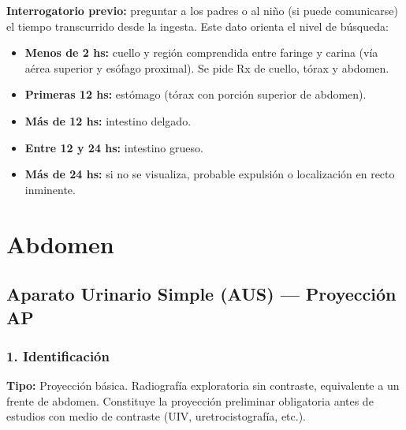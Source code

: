 	\medskip
	
	\textbf{Interrogatorio previo:} preguntar a los padres o al niño (si puede comunicarse) el tiempo transcurrido desde la ingesta. Este dato orienta el nivel de búsqueda:
	
	\begin{itemize}
		\item \textbf{Menos de 2 hs:} cuello y región comprendida entre faringe y carina (vía aérea superior y esófago proximal). Se pide Rx de cuello, tórax y abdomen.
		\item \textbf{Primeras 12 hs:} estómago (tórax con porción superior de abdomen).
		\item \textbf{Más de 12 hs:} intestino delgado.
		\item \textbf{Entre 12 y 24 hs:} intestino grueso.
		\item \textbf{Más de 24 hs:} si no se visualiza, probable expulsión o localización en recto inminente.
	\end{itemize}
	
	
\clearpage
	
	\section{Abdomen}
	
	\subsection{Aparato Urinario Simple (AUS) --- Proyección AP}
	
	\subsubsection*{1. Identificación}
	
	\textbf{Tipo:} Proyección básica. Radiografía exploratoria sin contraste, equivalente a un frente de abdomen. Constituye la proyección preliminar obligatoria antes de estudios con medio de contraste (UIV, uretrocistografía, etc.).
	
